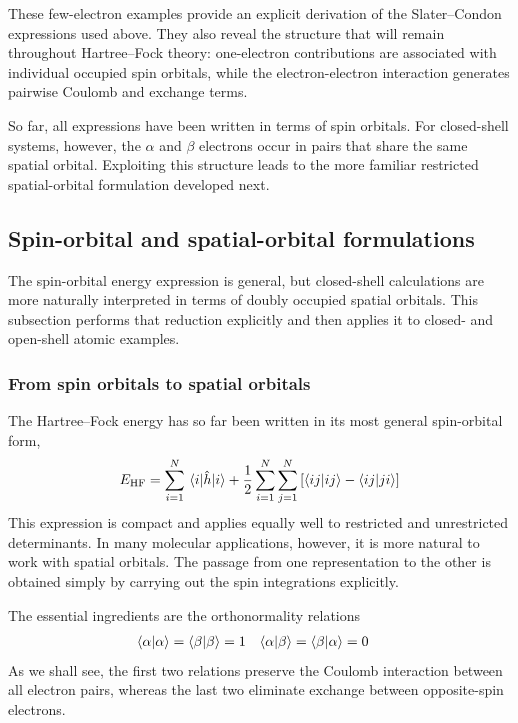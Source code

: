 \documentclass[11pt,a4paper,titlepage]{article}
\numberwithin{equation}{section}
\newcommand{\EHF}{E_\text{HF}}
\newcommand{\hh}{\Hat{h}}
\begin{document}
These few-electron examples provide an explicit derivation of the
Slater--Condon expressions used above. They also reveal the structure that
will remain throughout Hartree--Fock theory: one-electron contributions are
associated with individual occupied spin orbitals, while the
electron-electron interaction generates pairwise Coulomb and exchange
terms.

So far, all expressions have been written in terms of spin orbitals. For
closed-shell systems, however, the $\alpha$ and $\beta$ electrons occur in
pairs that share the same spatial orbital. Exploiting this structure leads
to the more familiar restricted spatial-orbital formulation developed next.

\subsection{Spin-orbital and spatial-orbital formulations}

The spin-orbital energy expression is general, but closed-shell calculations
are more naturally interpreted in terms of doubly occupied spatial orbitals.
This subsection performs that reduction explicitly and then applies it to
closed- and open-shell atomic examples.

\subsubsection{From spin orbitals to spatial orbitals}

The Hartree--Fock energy has so far been written in its most general
spin-orbital form,
\begin{equation}
  \EHF
  =
  \sum_{i=1}^{N}\mel{i}{\hh}{i}
  +
  \frac{1}{2}
  \sum_{i=1}^{N}\sum_{j=1}^{N}
  \qty[
    \braket{ij}{ij}
    -
    \braket{ij}{ji}
  ]
  \label{eq:hf-energy-spin-general}
\end{equation}
This expression is compact and applies equally well to restricted and
unrestricted determinants. In many molecular applications, however, it is
more natural to work with spatial orbitals. The passage from one
representation to the other is obtained simply by carrying out the spin
integrations explicitly.

The essential ingredients are the orthonormality relations
\begin{align}
  \braket{\alpha}{\alpha}
  =
  \braket{\beta}{\beta}
  &=
  1
  &
  \braket{\alpha}{\beta}
  =
  \braket{\beta}{\alpha}
  &=
  0
  \label{eq:spin-orthogonality-spatial-reduction}
\end{align}
As we shall see, the first two relations preserve the Coulomb interaction
between all electron pairs, whereas the last two eliminate exchange between
opposite-spin electrons.
\end{document}

